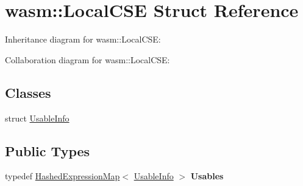 \hypertarget{structwasm_1_1_local_c_s_e}{}\section{wasm\+:\+:Local\+C\+SE Struct Reference}
\label{structwasm_1_1_local_c_s_e}


Inheritance diagram for wasm\+:\+:Local\+C\+SE\+:


Collaboration diagram for wasm\+:\+:Local\+C\+SE\+:
\subsection*{Classes}
\begin{DoxyCompactItemize}
\item 
struct \mbox{\hyperlink{structwasm_1_1_local_c_s_e_1_1_usable_info}{Usable\+Info}}
\end{DoxyCompactItemize}
\subsection*{Public Types}
\begin{DoxyCompactItemize}
\item 
\mbox{\label{structwasm_1_1_local_c_s_e_af76336c9ebdaca6253eafa27433439bf}} 
typedef \mbox{\hyperlink{classwasm_1_1_hashed_expression_map}{Hashed\+Expression\+Map}}$<$ \mbox{\hyperlink{structwasm_1_1_local_c_s_e_1_1_usable_info}{Usable\+Info}} $>$ {\bfseries Usables}
\end{DoxyCompactItemize}
